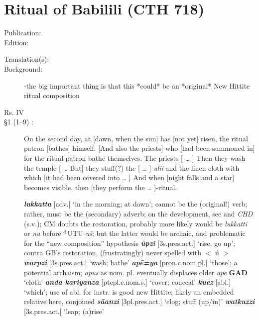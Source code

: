 \documentclass[10pt]{article}
\newcommand{\supersc}[1]{$^{\textrm{\scriptsize{#1}}}$}  	%
\newcommand{\bit}[1]{\textbf{\textit{#1}}}				%
\newcommand{\p}[1]{{\tiny[{#1}]}}					%
\newcommand{\hith}{\textsubwedge{h}}
\renewcommand{\.}[1]{\textsubdot{#1}}
\begin{document}
\section{Ritual of Babilili (CTH 718)}

\begin{description}

\item[Publication:] 
\item[Edition:] \citet{beckman2014babilili}
\item[Translation(s):] 
\item[Background:] -the big important thing is that this *could* be an *original* New Hittite ritual composition

\bigskip
\item[Rs. IV]
\bigskip

\item[\S1 (1--9) :] On the second day, at [dawn, when the sun] has [not yet] risen, the ritual patron [bathes] himself. [And also the priests] who [had been summoned in] for the ritual patron bathe themselves. The priests [ {\ldots} ] Then they wash the temple [ {\ldots} But] they stuff(?) the [ {\ldots} ] \textit{uli{\hith}i} and the linen cloth with which [it had been covered into {\ldots} ] And when [night falls and a star] becomes visible, then [they perform the {\ldots} ]-ritual.


\begin{notes}

\bit{lukkatta} \p{adv.} `in the morning; at dawn'; cannot be the (original!) verb; rather, must be the (secondary) adverb; on the development, see \citet{vijunas2009tstems} and \textit{CHD} (s.v.); CM doubts the restoration, probably more likely would be \textit{lukkatti} or \textit{nu} before \supersc{d}UTU\textit{-u\v{s}}; but the latter would be archaic, and problematic for the ``new composition'' hypothesis \bit{\=upzi} \p{3s.pres.act.} `rise, go up'; contra GB's restoration, (frustratingly) never spelled  with $<$ \'u $>$ \bit{warpzi} \p{3s.pres.act.} `wash; bathe' \bit{ap\=e=ya} \p{pron.c.nom.pl.} `those'; a potential archaism; \textit{ap\=us} as nom. pl. eventually displaces older \textit{ap\=e} \textbf{GAD} `cloth' \bit{anda kariyanza} \p{ptcpl.c.nom.s.} `cover; conceal' \bit{ku\=ez} \p{abl.} `which'; use of abl. for instr. is good new Hittite; likely an embedded relative here, conjoined  \bit{s\=a{\hith}anzi} \p{3pl.pres.act.} `clog; stuff (up/in)' \bit{watkuzzi} \p{3s.pres.act.} `leap; (a)rise' 

\end{notes}


\end{description}
\end{document}
